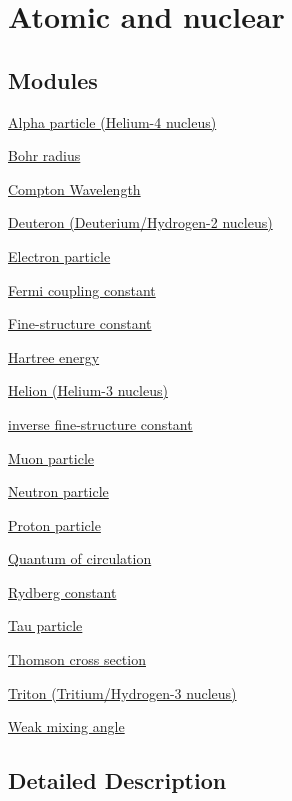 \hypertarget{group___atomic}{}\section{Atomic and nuclear}
\label{group___atomic}
\subsection*{Modules}
\begin{DoxyCompactItemize}
\item 
\hyperlink{group___alpha}{Alpha particle (\+Helium-\/4 nucleus)}
\item 
\hyperlink{group___bohr_radius}{Bohr radius}
\item 
\hyperlink{group___compton_wavelength}{Compton Wavelength}
\item 
\hyperlink{group___deuteron}{Deuteron (\+Deuterium/\+Hydrogen-\/2 nucleus)}
\item 
\hyperlink{group___electron}{Electron particle}
\item 
\hyperlink{group___fermi_coupling}{Fermi coupling constant}
\item 
\hyperlink{group___fine_structure}{Fine-\/structure constant}
\item 
\hyperlink{group___hartree_energy}{Hartree energy}
\item 
\hyperlink{group___helion}{Helion (\+Helium-\/3 nucleus)}
\item 
\hyperlink{group___inverse_fine_structure_constant}{inverse fine-\/structure constant}
\item 
\hyperlink{group___muon}{Muon particle}
\item 
\hyperlink{group___neutron}{Neutron particle}
\item 
\hyperlink{group___proton}{Proton particle}
\item 
\hyperlink{group___quantum_of_circulation}{Quantum of circulation}
\item 
\hyperlink{group___rydberg_constant}{Rydberg constant}
\item 
\hyperlink{group___tau}{Tau particle}
\item 
\hyperlink{group___thomson}{Thomson cross section}
\item 
\hyperlink{group___triton}{Triton (\+Tritium/\+Hydrogen-\/3 nucleus)}
\item 
\hyperlink{group___weak_mixing_angle}{Weak mixing angle}
\end{DoxyCompactItemize}


\subsection{Detailed Description}
